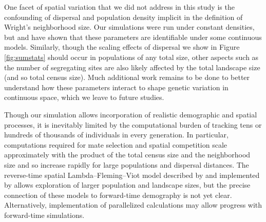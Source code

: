 \documentclass[10pt,twoside,lineno,hidelinks]{preprint}
\begin{document}

One facet of spatial variation that we did not address in this study is the confounding of dispersal and population density implicit in the definition of Wright's neighborhood size. Our simulations were run under constant densities, but \citet{guindon2016demographic} and \citet{Ringbauer2017} 
have shown that these parameters are identifiable under some continuous models. Similarly, though the scaling effects of dispersal we show in Figure \ref{fig:sumstats} should occur in populations of any total size, other aspects such as the number of segregating sites are also likely affected by the total landscape size (and so total census size). 
Much additional work remains to be done to better understand how these parameters interact to shape genetic variation in continuous space, which we leave to future studies. 

Though our simulation allows incorporation of realistic demographic and spatial processes, 
it is inevitably limited by the computational burden of tracking tens or hundreds of thousands of individuals in every generation. 
In particular, computations required for mate selection and spatial competition scale approximately with the product of the total census size and the neighborhood size and so increase rapidly for large populations and dispersal distances. 
The reverse-time spatial Lambda--Fleming--Viot model described by \citet{Barton2010} and implemented by \citet{Kelleher2014} 
allows exploration of larger population and landscape sizes,
but the precise connection of these models to forward-time demography is not yet clear.
Alternatively, implementation of parallelized calculations may allow progress with forward-time simulations.
\end{document}
